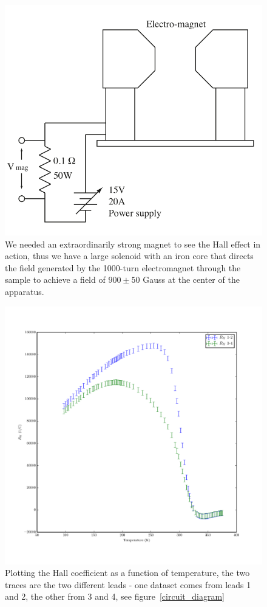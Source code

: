 \documentclass[reprint, nobibnotes, amssymb, amsmath, amsfonts, physics, mathtools, mathrsfs, floatfix]{revtex4-1}
\begin{document}
\begin{widetext}
      \begin{figure}[h]
        \centering
        \includegraphics[width=\linewidth]{magnet_setup.png}
        \caption{We needed an extraordinarily strong magnet to see the Hall effect in action, thus we have a large solenoid with an iron core that directs the field generated by the 1000-turn electromagnet through the sample to achieve a field of $900\pm50$ Gauss at the center of the apparatus.~\label{magnet}~\cite{lab_manual}}
      \end{figure}

      \begin{figure}[h]
        \centering
        \includegraphics[width=\linewidth]{../plots/T_vs_R_H.pdf}
        \caption{Plotting the Hall coefficient as a function of temperature, the two traces are the two different leads - one dataset comes from leads 1 and 2, the other from 3 and 4, see figure~\ref{circuit_diagram} \label{RH_vs_T}}
      \end{figure}


\end{widetext}
\end{document}
